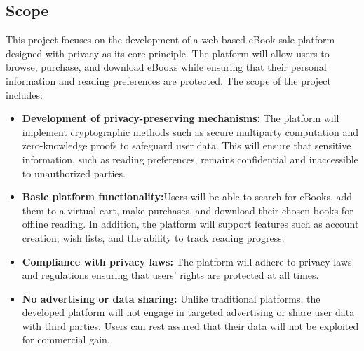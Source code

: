 \documentclass[12pt]{article}
\begin{document}
\subsection{Scope}
This project focuses on the development of a web-based eBook sale platform designed with privacy as its core principle. The platform will allow users to browse, purchase, and download eBooks while ensuring that their personal information and reading preferences are protected. The scope of the project includes:
\begin{itemize}
	\item \textbf{	Development of privacy-preserving mechanisms: }The platform will implement cryptographic methods such as secure multiparty computation and zero-knowledge proofs to safeguard user data. This will ensure that sensitive information, such as reading preferences, remains confidential and inaccessible to unauthorized parties.
	\item \textbf{	Basic platform functionality:}Users will be able to search for eBooks, add them to a virtual cart, make purchases, and download their chosen books for offline reading. In addition, the platform will support features such as account creation, wish lists, and the ability to track reading progress.
	\item \textbf{Compliance with privacy laws: }The platform will adhere to privacy laws and regulations ensuring that users' rights are protected at all times.
	\item \textbf{	No advertising or data sharing: }Unlike traditional platforms, the developed platform will not engage in targeted advertising or share user data with third parties. Users can rest assured that their data will not be exploited for commercial gain.
	

\end{itemize}
\end{document}
